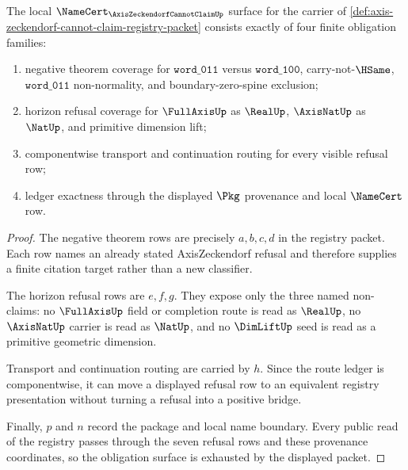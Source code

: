 \begin{theorem}
\label{thm:axis-zeckendorf-cannot-claim-registry-obligations}
The local $\NameCert_{\AxisZeckendorfCannotClaimUp}$ surface for the carrier of \autoref{def:axis-zeckendorf-cannot-claim-registry-packet} consists exactly of four finite obligation families:
\begin{enumerate}
\item negative theorem coverage for $\mathtt{word\_011}$ versus $\mathtt{word\_100}$, carry-not-$\HSame$, $\mathtt{word\_011}$ non-normality, and boundary-zero-spine exclusion;
\item horizon refusal coverage for $\FullAxisUp$ as $\RealUp$, $\AxisNatUp$ as $\NatUp$, and primitive dimension lift;
\item componentwise transport and continuation routing for every visible refusal row;
\item ledger exactness through the displayed $\Pkg$ provenance and local $\NameCert$ row.
\end{enumerate}
\end{theorem}
\begin{proof}
The negative theorem rows are precisely $a,b,c,d$ in the registry packet. Each row names an already stated AxisZeckendorf refusal and therefore supplies a finite citation target rather than a new classifier.

The horizon refusal rows are $e,f,g$. They expose only the three named non-claims: no $\FullAxisUp$ field or completion route is read as $\RealUp$, no $\AxisNatUp$ carrier is read as $\NatUp$, and no $\DimLiftUp$ seed is read as a primitive geometric dimension.

Transport and continuation routing are carried by $h$. Since the route ledger is componentwise, it can move a displayed refusal row to an equivalent registry presentation without turning a refusal into a positive bridge.

Finally, $p$ and $n$ record the package and local name boundary. Every public read of the registry passes through the seven refusal rows and these provenance coordinates, so the obligation surface is exhausted by the displayed packet.
\end{proof}

